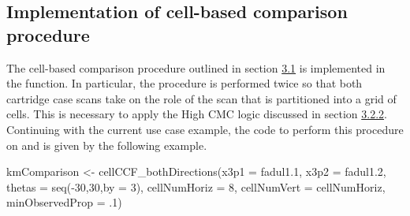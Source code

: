 \begin{Schunk}
\end{Schunk}

\subsection{Implementation of cell-based comparison procedure}

The cell-based comparison procedure outlined in section
\protect\hyperlink{comparisonProcedure}{3.1} is implemented in the
 function. In particular, the procedure is
performed twice so that both cartridge case scans take on the role of
the scan that is partitioned into a grid of cells. This is necessary to
apply the High CMC logic discussed in section
\protect\hyperlink{highCMCMethod}{3.2.2}. Continuing with the current
use case example, the code to perform this procedure on 
and  is given by the following example.

\begin{Schunk}
\begin{Sinput}
kmComparison <- cellCCF_bothDirections(x3p1 = fadul1.1,
                                       x3p2 = fadul1.2,
                                       thetas = seq(-30,30,by = 3),
                                       cellNumHoriz = 8,
                                       cellNumVert = cellNumHoriz,
                                       minObservedProp = .1)
\end{Sinput}
\end{Schunk}

